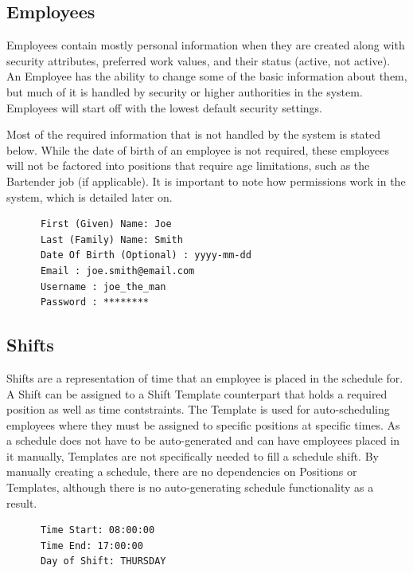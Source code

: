 \documentclass[a4paper,10pt]{report}
\begin{document}
\subsection{Employees}

\par \noindent \hspace*{1cm} Employees contain mostly personal information when they are created along with security attributes, preferred work values, and their status (active, not active). An Employee has the ability to change some of the basic information about them, but much of it is handled by security or higher authorities in the system. Employees will start off with the lowest default security settings.
\bigskip
\par \noindent \hspace*{1cm} Most of the required information that is not handled by the system is stated below. While the date of birth of an employee is not required, these employees will not be factored into positions that require age limitations, such as the Bartender job (if applicable). It is important to note how permissions work in the system, which is detailed later on.

\begin{verbatim}
      First (Given) Name: Joe
      Last (Family) Name: Smith
      Date Of Birth (Optional) : yyyy-mm-dd
      Email : joe.smith@email.com
      Username : joe_the_man
      Password : ********
\end{verbatim}

\subsection{Shifts}

\par \noindent \hspace*{1cm} Shifts are a representation of time that an employee is placed in the schedule for. A Shift can be assigned to a Shift Template counterpart that holds a required position as well as time contstraints. The Template is used for auto-scheduling employees where they must be assigned to specific positions at specific times. As a schedule does not have to be auto-generated and can have employees placed in it manually, Templates are not specifically needed to fill a schedule shift. By manually creating a schedule, there are no dependencies on Positions or Templates, although there is no auto-generating schedule functionality as a result. 

\begin{verbatim}
      Time Start: 08:00:00
      Time End: 17:00:00
      Day of Shift: THURSDAY
\end{verbatim}
\end{document}
